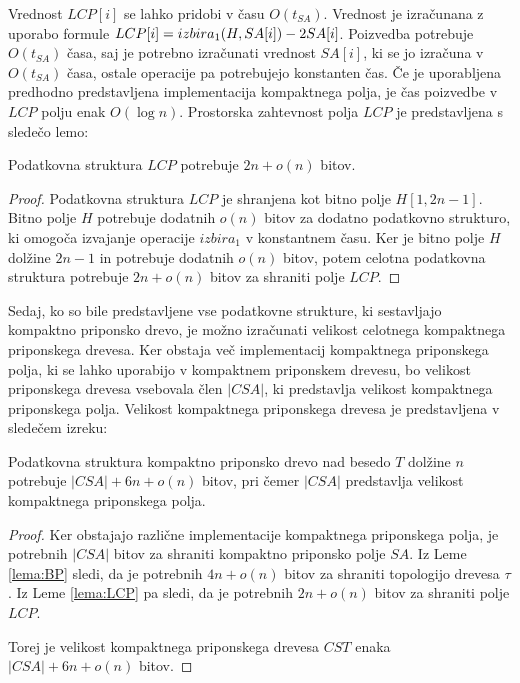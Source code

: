 Vrednost $LCP[i]$ se lahko pridobi v času $O(t_{SA})$. Vrednost je izračunana z uporabo formule $LCP[i]= \mathop{izbira}\nolimits_{1}(H,SA[i])-2SA[i]$. Poizvedba potrebuje $O(t_{SA})$ časa, saj je potrebno izračunati vrednost $SA[i]$, ki se jo izračuna v $O(t_{SA})$ časa, ostale operacije pa potrebujejo konstanten čas. Če je uporabljena predhodno predstavljena implementacija kompaktnega polja, je čas poizvedbe v $LCP$ polju enak $O(\log{n})$. Prostorska zahtevnost polja $LCP$ je predstavljena s sledečo lemo:

\begin{lema}\label{lema:LCP}
 Podatkovna struktura $LCP$ potrebuje $2n+o(n)$ bitov.
\end{lema}

\begin{proof}
    Podatkovna struktura $LCP$ je shranjena kot bitno polje $H[1,2n-1]$. Bitno polje $H$ potrebuje dodatnih $o(n)$ bitov za dodatno podatkovno strukturo, ki omogoča izvajanje operacije $izbira_1$ v konstantnem času. Ker je bitno polje $H$ dolžine $2n-1$ in potrebuje dodatnih $o(n)$ bitov, potem celotna podatkovna struktura potrebuje $2n+o(n)$ bitov za shraniti polje $LCP$.
\end{proof}

Sedaj, ko so bile predstavljene vse podatkovne strukture, ki sestavljajo kompaktno priponsko drevo, je možno izračunati velikost celotnega kompaktnega priponskega drevesa. Ker obstaja več implementacij kompaktnega priponskega polja, ki se lahko uporabijo v kompaktnem priponskem drevesu, bo velikost priponskega drevesa vsebovala člen $|CSA|$, ki predstavlja velikost kompaktnega priponskega polja. Velikost kompaktnega priponskega drevesa je predstavljena v sledečem izreku:

\begin{izr}
    Podatkovna struktura kompaktno priponsko drevo nad besedo $T$ dolžine $n$ potrebuje $|CSA|+6n+o(n)$ bitov, pri čemer $|CSA|$ predstavlja velikost kompaktnega priponskega polja.
\end{izr}
\begin{proof}
    Ker obstajajo različne implementacije kompaktnega priponskega polja, je potrebnih $|CSA|$ bitov za shraniti kompaktno priponsko polje $SA$. Iz Leme \ref{lema:BP} sledi, da je potrebnih $4n+o(n)$ bitov za shraniti topologijo drevesa $\tau$. Iz Leme \ref{lema:LCP} pa sledi, da je potrebnih $2n+o(n)$ bitov za shraniti polje $LCP$.

    Torej je velikost kompaktnega priponskega drevesa $CST$ enaka $|CSA|+6n+o(n)$ bitov.
\end{proof}

